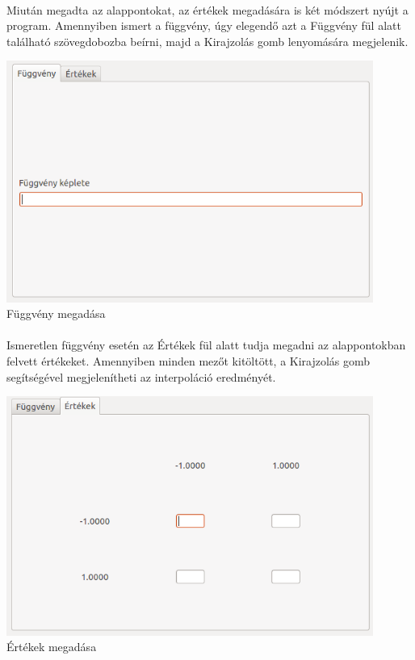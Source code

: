 \documentclass[12pt]{report}
\begin{document}
\paragraph{}
Miután megadta az alappontokat, az értékek megadására is két módszert nyújt a program. Amennyiben ismert a függvény, úgy elegendő azt a Függvény fül alatt található szövegdobozba beírni, majd a Kirajzolás gomb lenyomására megjelenik.
\begin{center}
\includegraphics[width=12cm]{pics/gui/input2}  \\
{\footnotesize Függvény megadása} 
\end{center}
\paragraph{}
Ismeretlen függvény esetén az Értékek fül alatt tudja megadni az alappontokban felvett értékeket. Amennyiben minden mezőt kitöltött, a Kirajzolás gomb segítségével megjelenítheti az interpoláció eredményét.
\begin{center}
\includegraphics[width=12cm]{pics/gui/input1}  \\
{\footnotesize Értékek megadása} 
\end{center}
\end{document}
